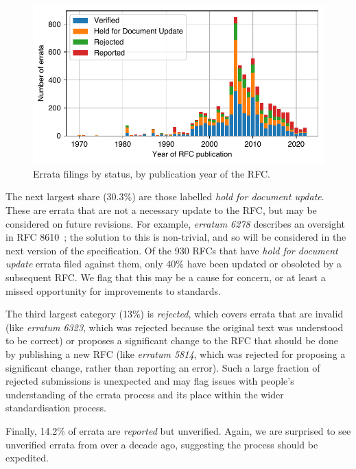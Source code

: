 \documentclass[twocolumn,10pt]{article}
\newlength{\figureWidthOneColumn}
\begin{document}
\begin{figure}
  \centering
  \includegraphics[width=\figureWidthOneColumn]{figures-prev/tma-2023/errata-by-status.pdf}
  \caption{
    Errata filings by status, by publication year of the RFC.
  }
  \label{fig:errata_status}
\end{figure}

The next largest share (30.3\%) are those labelled \emph{hold for document
update}.  These are errata that are not a necessary update to the RFC, but
may be considered on future revisions. For example, \emph{erratum 6278}
describes an oversight in RFC 8610~\cite{RFC8610}; the solution to this is
non-trivial, and so will be considered in the next version of the
specification. Of the 930 RFCs that have \emph{hold for document update}
errata filed against them, only 40\% have been updated or obsoleted by a
subsequent RFC.  We flag that this may be a cause for concern, or at least
a missed opportunity for improvements to standards.

The third largest category (13\%) is \emph{rejected}, which covers errata
that are invalid (like \emph{erratum 6323}, which was rejected because the
original text was understood to be correct) or proposes a significant
change to the RFC that should be done by publishing a new RFC (like
\emph{erratum 5814}, which was rejected for proposing a significant change,
rather than reporting an error). Such a large fraction of rejected
submissions is unexpected and may flag issues with people's understanding
of the errata process and its place within the wider standardisation
process.

Finally, 14.2\% of errata are \emph{reported} but unverified.  Again, we
are surprised to see unverified errata from over a decade ago, suggesting
the process should be expedited. 
\end{document}
